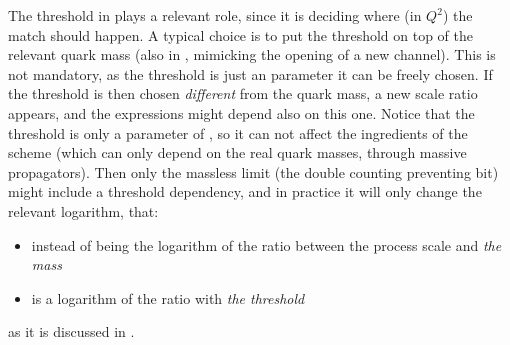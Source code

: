 The threshold in \fonll plays a relevant role, since it is deciding where (in
$Q^2$) the match should happen.
%
A typical choice is to put the threshold on top of the relevant quark mass (also
in \zmvfns, mimicking the opening of a new channel). This is \textit{}not
mandatory\textit{}, as the threshold is just an \fns parameter it can be freely
chosen.
%
If the threshold is then chosen \textit{different} from the quark mass, a new scale
ratio appears, and the expressions might depend also on this one.
Notice that the threshold is only a parameter of \fonll, so it can not affect
the \ffns ingredients of the scheme (which can only depend on the real quark
masses, through massive propagators).
Then only the massless limit (the double counting preventing bit) might include
a threshold dependency, and in practice it will only change the relevant
logarithm, that:
\begin{itemize}
  \item  instead of being the logarithm of the ratio between the process scale
    and \textit{the mass}
  \item is a logarithm of the ratio with \textit{the threshold}
\end{itemize}
as it is discussed in \cite{Forte:2018ovl}.
